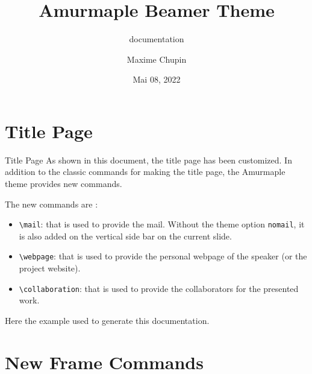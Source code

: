 \documentclass[10pt,aspectratio=169,english]{beamer}
\begin{document}
\section{Title Page}

\sepframe

\begin{frame}{Title Page}
  As shown in this document, the title page has been customized.
  In addition to the classic commands for making the title page, the Amurmaple
  theme provides new commands.

  The new commands are :
  \begin{itemize}
  \item \lstinline+\mail+: that is used to provide the mail. Without the theme option
    \lstinline+nomail+, it is also added on the vertical side bar on the current
    slide.
  \item \lstinline+\webpage+: that is used to provide the personal webpage of
    the speaker (or the project website).
  \item \lstinline+\collaboration+: that is used to provide the collaborators
    for the presented work.
  \end{itemize}

  \framebreak

  Here the example used to generate this documentation.
  \begin{Code}
\title[Amurmaple documentation]{Amurmaple Beamer Theme}
\author[M.~Chupin]{Maxime Chupin}
\subtitle{documentation}
\date{Mai 08, 2022}
\end{Code}

\end{frame}

\section{New Frame Commands}
\end{document}

